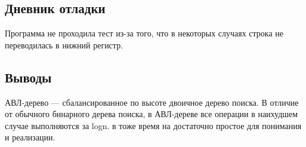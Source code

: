 \documentclass[12pt]{article}
\begin{document}
\subsection*{Дневник отладки}

Программа не проходила тест из-за того, что в некоторых случаях строка не переводилась в нижний регистр.

\subsection*{Выводы}

АВЛ-дерево — сбалансированное по высоте двоичное дерево поиска. В отличие от обычного бинарного дерева поиска, в АВЛ-дереве все операции в наихудшем случае выполняются за logn. в тоже время на достаточно простое для понимания и реализации.
\end{document}
